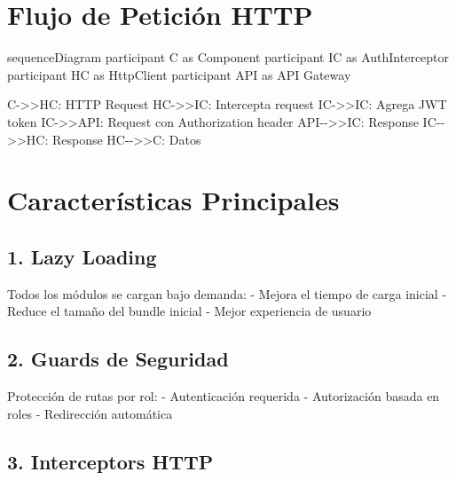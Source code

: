 \documentclass[
  spanish,
  11pt,
  letterpaper,
]{book}
\newenvironment{Shaded}{\begin{snugshade}}{\end{snugshade}}
\newcommand{\NormalTok}[1]{\textcolor[rgb]{0.00,0.23,0.31}{#1}}
\begin{document}
\section{Flujo de Petición HTTP}\label{flujo-de-peticiuxf3n-http}

\begin{Shaded}
\begin{Highlighting}[]
\NormalTok{sequenceDiagram}
\NormalTok{    participant C as Component}
\NormalTok{    participant IC as AuthInterceptor}
\NormalTok{    participant HC as HttpClient}
\NormalTok{    participant API as API Gateway}
    
\NormalTok{    C{-}\textgreater{}\textgreater{}HC: HTTP Request}
\NormalTok{    HC{-}\textgreater{}\textgreater{}IC: Intercepta request}
\NormalTok{    IC{-}\textgreater{}\textgreater{}IC: Agrega JWT token}
\NormalTok{    IC{-}\textgreater{}\textgreater{}API: Request con Authorization header}
\NormalTok{    API{-}{-}\textgreater{}\textgreater{}IC: Response}
\NormalTok{    IC{-}{-}\textgreater{}\textgreater{}HC: Response}
\NormalTok{    HC{-}{-}\textgreater{}\textgreater{}C: Datos}
\end{Highlighting}
\end{Shaded}

\section{Características
Principales}\label{caracteruxedsticas-principales}

\subsection{1. Lazy Loading}\label{lazy-loading}

Todos los módulos se cargan bajo demanda: - Mejora el tiempo de carga
inicial - Reduce el tamaño del bundle inicial - Mejor experiencia de
usuario

\subsection{2. Guards de Seguridad}\label{guards-de-seguridad}

Protección de rutas por rol: - Autenticación requerida - Autorización
basada en roles - Redirección automática

\subsection{3. Interceptors HTTP}\label{interceptors-http}
\end{document}
